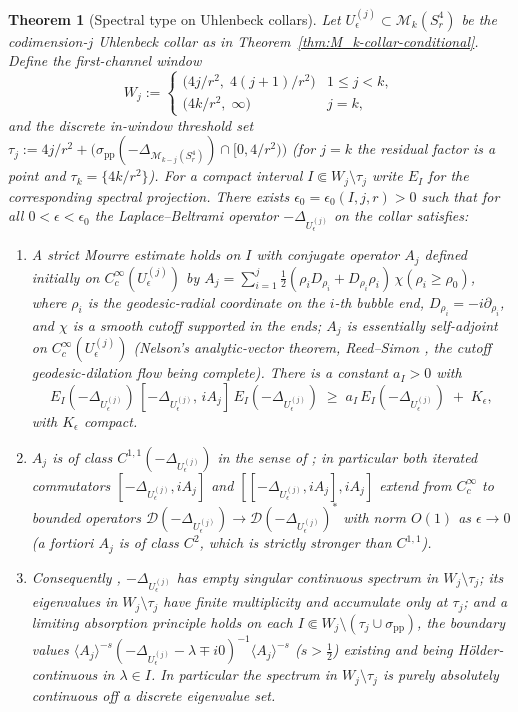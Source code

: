 \documentclass[11pt,letterpaper]{article}
\newtheorem{theorem}{Theorem}[section]
\theoremstyle{definition}
\newcommand{\cM}{\mathcal{M}}
\newcommand{\Lap}{\Delta}
\begin{document}
\begin{theorem}[Spectral type on Uhlenbeck collars]\label{thm:M_k-collar-spectral-type}
Let $U_\epsilon^{(j)} \subset \cM_k(S^4_r)$ be the codimension-$j$ Uhlenbeck collar as in Theorem~\ref{thm:M_k-collar-conditional}. Define the \emph{first-channel window}
\[
W_j := \begin{cases}\bigl(4j/r^2,\; 4(j+1)/r^2\bigr) & 1 \le j < k,\\[2pt] \bigl(4k/r^2,\; \infty\bigr) & j = k,\end{cases}
\]
and the discrete in-window threshold set $\tau_j := 4j/r^2 + \bigl(\sigma_{\mathrm{pp}}(-\Lap_{\cM_{k-j}(S^4_r)})\cap[0, 4/r^2)\bigr)$ (for $j = k$ the residual factor is a point and $\tau_k = \{4k/r^2\}$). For a compact interval $I \Subset W_j\setminus\tau_j$ write $E_I$ for the corresponding spectral projection. There exists $\epsilon_0 = \epsilon_0(I, j, r) > 0$ such that for all $0 < \epsilon < \epsilon_0$ the Laplace--Beltrami operator $-\Lap_{U_\epsilon^{(j)}}$ on the collar satisfies:
\begin{enumerate}\setlength{\itemsep}{2pt}
\item[\textup{(i)}] A strict Mourre estimate holds on $I$ with conjugate operator $A_j$ defined initially on $C_c^\infty(U_\epsilon^{(j)})$ by $A_j = \sum_{i=1}^j \tfrac12(\rho_i D_{\rho_i} + D_{\rho_i}\rho_i)\,\chi(\rho_i \ge \rho_0)$, where $\rho_i$ is the geodesic-radial coordinate on the $i$-th bubble end, $D_{\rho_i} = -i\partial_{\rho_i}$, and $\chi$ is a smooth cutoff supported in the ends; $A_j$ is essentially self-adjoint on $C_c^\infty(U_\epsilon^{(j)})$ (Nelson's analytic-vector theorem, Reed--Simon \cite[Thm.~X.39]{ReedSimonII}, the cutoff geodesic-dilation flow being complete). There is a constant $a_I > 0$ with
\[
E_I(-\Lap_{U_\epsilon^{(j)}})\,[-\Lap_{U_\epsilon^{(j)}},\,iA_j]\,E_I(-\Lap_{U_\epsilon^{(j)}})\;\ge\;a_I\,E_I(-\Lap_{U_\epsilon^{(j)}})\;+\;K_\epsilon,
\]
with $K_\epsilon$ compact.
\item[\textup{(ii)}] $A_j$ is of class $C^{1,1}(-\Lap_{U_\epsilon^{(j)}})$ in the sense of \cite[Def.~6.2.2]{ABMG1996}; in particular both iterated commutators $[-\Lap_{U_\epsilon^{(j)}}, iA_j]$ and $[[-\Lap_{U_\epsilon^{(j)}}, iA_j], iA_j]$ extend from $C_c^\infty$ to bounded operators $\mathcal{D}(-\Lap_{U_\epsilon^{(j)}})\to \mathcal{D}(-\Lap_{U_\epsilon^{(j)}})^*$ with norm $O(1)$ as $\epsilon\to 0$ (a fortiori $A_j$ is of class $C^2$, which is strictly stronger than $C^{1,1}$).
\item[\textup{(iii)}] Consequently \cite[Thm.~0.1]{Sahbani1997}, $-\Lap_{U_\epsilon^{(j)}}$ has empty singular continuous spectrum in $W_j\setminus\tau_j$; its eigenvalues in $W_j\setminus\tau_j$ have finite multiplicity and accumulate only at $\tau_j$; and a limiting absorption principle holds on each $I \Subset W_j\setminus(\tau_j\cup\sigma_{\mathrm{pp}})$, the boundary values $\langle A_j\rangle^{-s}(-\Lap_{U_\epsilon^{(j)}} - \lambda \mp i0)^{-1}\langle A_j\rangle^{-s}$ ($s>\tfrac12$) existing and being H\"older-continuous in $\lambda\in I$. In particular the spectrum in $W_j\setminus\tau_j$ is purely absolutely continuous off a discrete eigenvalue set.

\end{enumerate}
\end{theorem}
\end{document}
